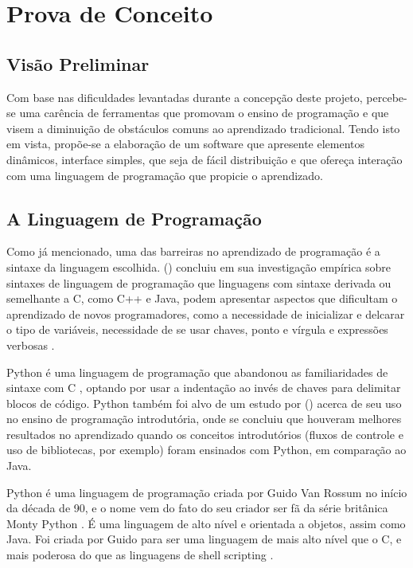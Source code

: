 \chapter[Prova de Conceito]{Prova de Conceito}

\section{Visão Preliminar}

Com base nas dificuldades levantadas durante a concepção deste projeto, percebe-se uma carência de ferramentas que promovam o ensino de programação e que visem a diminuição de obstáculos comuns ao aprendizado tradicional. Tendo isto em vista, propõe-se a elaboração de um software que apresente elementos dinâmicos, interface simples, que seja de fácil distribuição e que ofereça interação com uma linguagem de programação que propicie o aprendizado.

\section{A Linguagem de Programação}

Como já mencionado, uma das barreiras no aprendizado de programação é a sintaxe da linguagem escolhida. \citeauthor{stefik2013} (\citeyear{stefik2013}) concluiu em sua investigação empírica sobre sintaxes de linguagem de programação que linguagens com sintaxe derivada ou semelhante a C, como C++ e Java, podem apresentar aspectos que dificultam o aprendizado de novos programadores, como a necessidade de inicializar e delcarar o tipo de variáveis, necessidade de se usar chaves, ponto e vírgula e expressões verbosas \cite{mannila2006}.

Python é uma linguagem de programação que abandonou as familiaridades de sintaxe com C \cite{stefik2013}, optando por usar a indentação ao invés de chaves para delimitar blocos de código. Python também foi alvo de um estudo por \citeauthor{jayal2015} (\citeyear{jayal2015}) acerca de seu uso no ensino de programação introdutória, onde se concluiu que houveram melhores resultados no aprendizado quando os conceitos introdutórios (fluxos de controle e uso de bibliotecas, por exemplo) foram ensinados com Python, em comparação ao Java.

Python é uma linguagem de programação criada por Guido Van Rossum no início da década de 90, e o nome vem do fato do seu criador ser fã da série britânica Monty Python \cite{moraispires2002}. É uma linguagem de alto nível e orientada a objetos, assim como Java. Foi criada por Guido para ser uma linguagem de mais alto nível que o C, e mais poderosa do que as linguagens de shell scripting \cite{moraispires2002}.
	
